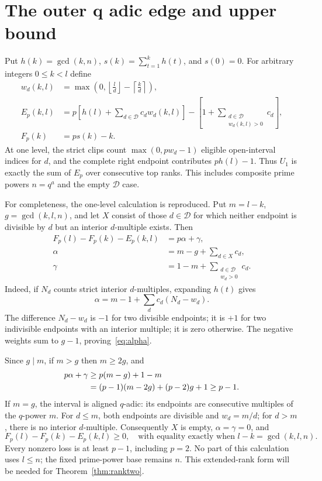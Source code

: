 \documentclass[11pt,letterpaper]{article}
\theoremstyle{definition}\newtheorem{definition}{Definition}
\newcommand{\D}{\mathcal D}
\begin{document}
\section{The outer q adic edge and upper bound}\label{sec:edge}
Put $h(k)=\gcd(k,n)$, $s(k)=\sum_{t=1}^{k}h(t)$, and $s(0)=0$. For arbitrary integers $0\le k<l$ define
\begin{align}
w_d(k,l)&=\max\left(0,\left\lfloor\frac ld\right\rfloor-\left\lceil\frac kd\right\rceil\right),\label{eq:w}\\
E_p(k,l)&=p\left[h(l)+\sum_{d\in\D}c_dw_d(k,l)\right]
-\left[1+\sum_{\substack{d\in\D\\w_d(k,l)>0}}c_d\right],\label{eq:edge}\\
F_p(k)&=ps(k)-k.\label{eq:potential}
\end{align}
At one level, the strict clips count $\max(0,pw_d-1)$ eligible open-interval indices for $d$, and the complete right endpoint contributes $ph(l)-1$. Thus $U_1$ is exactly the sum of $E_p$ over consecutive top ranks. This includes composite prime powers $n=q^a$ and the empty $\D$ case.

For completeness, the one-level calculation is reproduced. Put $m=l-k$, $g=\gcd(k,l,n)$, and let $X$ consist of those $d\in\D$ for which neither endpoint is divisible by $d$ but an interior $d$-multiple exists. Then
\begin{align}
F_p(l)-F_p(k)-E_p(k,l)&=p\alpha+\gamma,\label{eq:loss}\\
\alpha&=m-g+\sum_{d\in X}c_d,\label{eq:alpha}\\
\gamma&=1-m+\sum_{\substack{d\in\D\\w_d>0}}c_d.\label{eq:gamma}
\end{align}
Indeed, if $N_d$ counts strict interior $d$-multiples, expanding $h(t)$ gives
\[
\alpha=m-1+\sum_d c_d(N_d-w_d).
\]
The difference $N_d-w_d$ is $-1$ for two divisible endpoints; it is $+1$ for two indivisible endpoints with an interior multiple; it is zero otherwise. The negative weights sum to $g-1$, proving~\eqref{eq:alpha}.

Since $g\mid m$, if $m>g$ then $m\ge2g$, and
\begin{align}
p\alpha+\gamma&\ge p(m-g)+1-m\notag\\
&=(p-1)(m-2g)+(p-2)g+1\ge p-1.\label{eq:positive}
\end{align}
If $m=g$, the interval is aligned $q$-adic: its endpoints are consecutive multiples of the $q$-power $m$. For $d\le m$, both endpoints are divisible and $w_d=m/d$; for $d>m$, there is no interior $d$-multiple. Consequently $X$ is empty, $\alpha=\gamma=0$, and
\begin{equation}
F_p(l)-F_p(k)-E_p(k,l)\ge0,
\quad\text{with equality exactly when }l-k=\gcd(k,l,n).\label{eq:zero}
\end{equation}
Every nonzero loss is at least $p-1$, including $p=2$. No part of this calculation uses $l\le n$; the fixed prime-power base remains $n$. This extended-rank form will be needed for Theorem~\ref{thm:ranktwo}.
\end{document}
